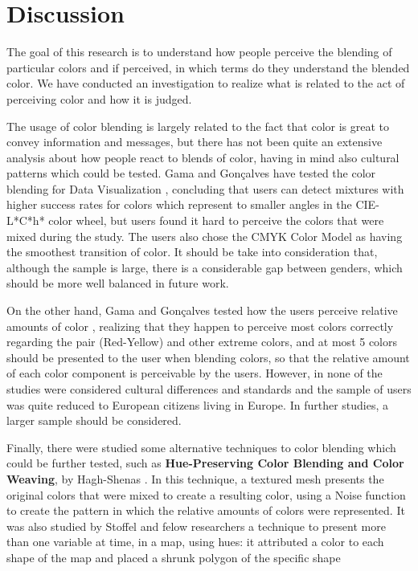 \section{Discussion}
\label{sec:background_discussion}
%
The goal of this research is to understand how people perceive the blending of particular colors and if perceived,
in which terms do they understand the blended color. We have conducted an investigation to realize what is related to
the act of perceiving color and how it is judged.  \par
The usage of color blending is largely related to the fact that color is great to convey information and messages,
but there has not been quite an extensive analysis about how people react to blends of color, having in mind also
cultural patterns which could be tested. Gama and Gonçalves have tested the color blending for Data Visualization \cite{Gama20141},
concluding that users can detect mixtures with higher success rates for colors which represent to smaller angles
in the CIE-L*C*h* color wheel, but users found it hard to perceive the colors that were mixed during the study.
The users also chose the CMYK Color Model as having the smoothest transition of color. It should be take into
consideration that, although the sample is large, there is a considerable gap between genders, which should be
more well balanced in future work. \par
On the other hand, Gama and Gonçalves tested how the users perceive relative amounts of color \cite{Gama20142}, realizing that they happen to perceive most
colors correctly regarding the pair (Red-Yellow) and other extreme colors, and at most 5 colors should be presented
to the user when blending colors, so that the relative amount of each color component is perceivable by the users.
However, in none of the studies were considered cultural differences and standards and the sample of users was
quite reduced to European citizens living in Europe. In further studies, a larger sample should be
considered. \par
Finally, there were studied some alternative techniques to color blending which could be further tested, such
as \textbf{Hue-Preserving Color Blending and Color Weaving}, by Hagh-Shenas \cite{Hagh-Shenas2007}. In this technique, a textured mesh presents the original
colors that were mixed to create a resulting color, using a Noise function to create the pattern in which the
relative amounts of colors were represented. It was also studied by Stoffel and felow researchers \cite{Stoffel2012} a technique
to present more than one variable at time, in a map, using hues: it attributed a color to each shape of the map and placed a shrunk polygon of the specific shape
